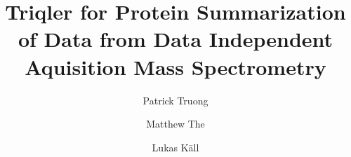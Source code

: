 \title{Triqler for Protein Summarization of Data from Data Independent Aquisition Mass Spectrometry}
\author{Patrick Truong \and Matthew The \and Lukas K\"{a}ll}

